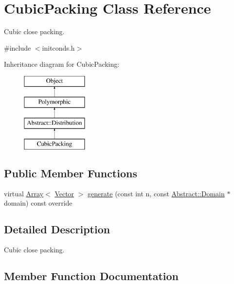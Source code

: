 \hypertarget{classCubicPacking}{}\section{Cubic\+Packing Class Reference}
\label{classCubicPacking}


Cubic close packing.  




{\ttfamily \#include $<$initconds.\+h$>$}

Inheritance diagram for Cubic\+Packing\+:\begin{figure}[H]
\begin{center}
\leavevmode
\includegraphics[height=4.000000cm]{classCubicPacking}
\end{center}
\end{figure}
\subsection*{Public Member Functions}
\begin{DoxyCompactItemize}
\item 
virtual \hyperlink{classArray}{Array}$<$ \hyperlink{classBasicVector}{Vector} $>$ \hyperlink{classCubicPacking_aa3c9a226ffa03b38a7b5fedad1414a01}{generate} (const int n, const \hyperlink{classAbstract_1_1Domain}{Abstract\+::\+Domain} $\ast$domain) const override
\end{DoxyCompactItemize}


\subsection{Detailed Description}
Cubic close packing. 

\subsection{Member Function Documentation}
\hypertarget{classCubicPacking_aa3c9a226ffa03b38a7b5fedad1414a01}{}\label{classCubicPacking_aa3c9a226ffa03b38a7b5fedad1414a01} 
